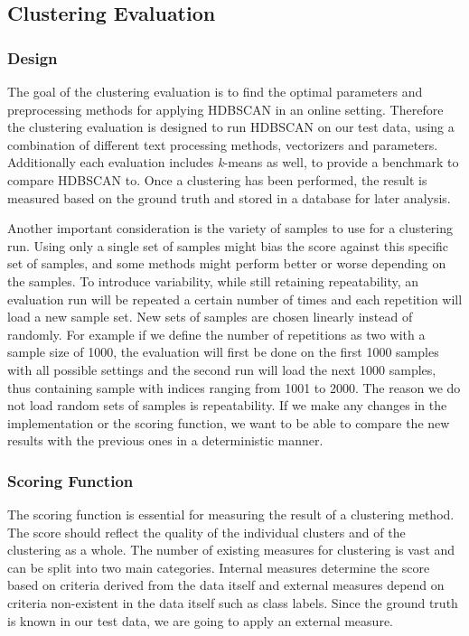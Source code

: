 \subsection{Clustering Evaluation}

\subsubsection{Design}

The goal of the clustering evaluation is to find the optimal parameters and preprocessing methods for applying HDBSCAN in an online setting. Therefore the clustering evaluation is designed to run HDBSCAN on our test data, using a combination of different text processing methods, vectorizers and parameters. Additionally each evaluation includes \textit{k}-means as well, to provide a benchmark to compare HDBSCAN to. Once a clustering has been performed, the result is measured based on the ground truth and stored in a database for later analysis.

Another important consideration is the variety of samples to use for a clustering run. Using only a single set of samples might bias the score against this specific set of samples, and some methods might perform better or worse depending on the samples. To introduce variability, while still retaining repeatability, an evaluation run will be repeated a certain number of times and each repetition will load a new sample set. New sets of samples are chosen linearly instead of randomly. For example if we define the number of repetitions as two with a sample size of 1000, the evaluation will first be done on the first 1000 samples with all possible settings and the second run will load the next 1000 samples, thus containing sample with indices ranging from 1001 to 2000. The reason we do not load random sets of samples is repeatability. If we make any changes in the implementation or the scoring function, we want to be able to compare the new results with the previous ones in a deterministic manner.

\subsubsection{Scoring Function}

The scoring function is essential for measuring the result of a clustering method. The score should reflect the quality of the individual clusters and of the clustering as a whole. The number of existing measures for clustering is vast and can be split into two main categories. Internal measures determine the score based on criteria derived from the data itself and external measures depend on criteria non-existent in the data itself such as class labels. Since the ground truth is known in our test data, we are going to apply an external measure.

